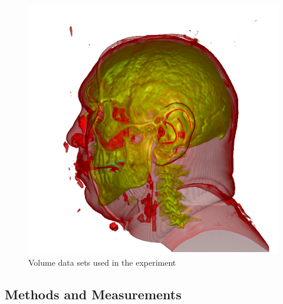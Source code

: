 \begin{figure}
\begin{minipage}{.15\textwidth}
\end{minipage}~
\begin{minipage}{.15\textwidth}
	\includegraphics[width=1\linewidth]{images/vismale_naive}
\end{minipage}
\caption{Volume data sets used in the experiment}
\label{fig:experiment_data_sets}
\end{figure}

\subsection{Methods and Measurements}
%

